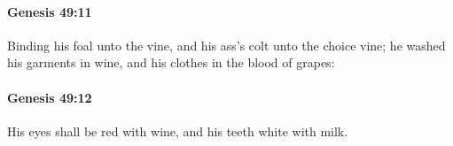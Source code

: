 		\paragraph{Genesis 49:11} %
			\label{GENESIS-49-11}

			Binding his foal unto the vine, and his ass's colt unto the choice vine; he washed his garments in wine, and his clothes in the blood of grapes:


		\paragraph{Genesis 49:12} %
			\label{GENESIS-49-12}

			His eyes shall be red with wine, and his teeth white with milk.


